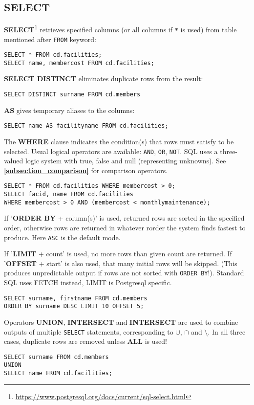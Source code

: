 %

\color{black}
\subsection{SELECT}
\textbf{SELECT}\footnote{\url{https://www.postgresql.org/docs/current/sql-select.html}} retrieves specified columns (or all columns if \texttt{*} is used) from table mentioned after \texttt{FROM} keyword:
\begin{verbatim}
SELECT * FROM cd.facilities;
SELECT name, membercost FROM cd.facilities;
\end{verbatim}

\textbf{SELECT DISTINCT} eliminates duplicate rows from the result:
\begin{verbatim}
SELECT DISTINCT surname FROM cd.members
\end{verbatim}

\textbf{AS} gives temporary aliases to the columns:
\begin{verbatim}
SELECT name AS facilityname FROM cd.facilities;
\end{verbatim}

The \textbf{WHERE} clause indicates the condition(s) that rows must satisfy to be selected. 
Usual logical operators are available: \texttt{AND}, \texttt{OR}, \texttt{NOT}.
SQL uses a three-valued logic system with true, false and null (representing unknowns).
See \textbf{\ref{subsection_comparison}} for comparison operators.
\begin{verbatim}
SELECT * FROM cd.facilities WHERE membercost > 0;
SELECT facid, name FROM cd.facilities
WHERE membercost > 0 AND (membercost < monthlymaintenance);
\end{verbatim}

If '\textbf{ORDER BY} + column(s)' is used, returned rows are sorted in the specified order, otherwise rows are returned in whatever rorder the system finds fastest to produce.
Here \texttt{ASC} is the default mode.

If '\textbf{LIMIT} + count' is used, no more rows than given count are returned.
If '\textbf{OFFSET} + start' is also used, that many initial rows will be skipped.
(This produces unpredictable output if rows are not sorted with \texttt{ORDER BY}!).
Standard SQL uses FETCH instead, LIMIT is Postgresql specific.

\begin{verbatim}
SELECT surname, firstname FROM cd.members
ORDER BY surname DESC LIMIT 10 OFFSET 5;
\end{verbatim}

Operators \textbf{UNION}, \textbf{INTERSECT} and \textbf{INTERSECT} are used to combine outputs of multiple \texttt{SELECT} statements, corresponding to $\cup$, $\cap$ and $\setminus$.
In all three cases, duplicate rows are removed unless \textbf{ALL} is used!
\begin{verbatim}
SELECT surname FROM cd.members
UNION
SELECT name FROM cd.facilities;
\end{verbatim}

%
